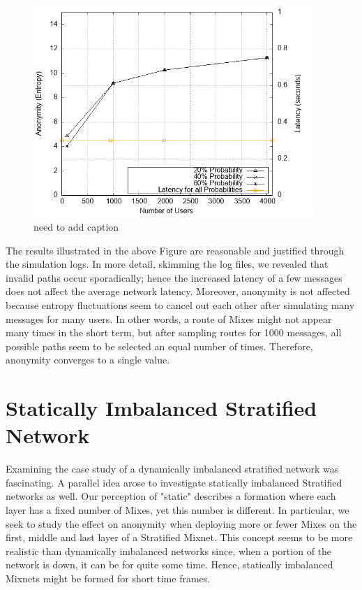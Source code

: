\documentclass[logo,msc,cyber]{infthesis}   %
\begin{document}
\begin{figure}[h!]
    \centering
    \includegraphics[height=8cm]{figures/simulator_extentions/mix_failure.png}
    \caption{need to add caption}
    \label{fig:dynamic-crash-probability}
\end{figure}    


The results illustrated in the above Figure are reasonable and justified through
the simulation logs. In more detail, skimming the log files, we revealed that
invalid paths occur sporadically; hence the increased latency of a few messages
does not affect the average network latency. Moreover, anonymity is not affected
because entropy fluctuations seem to cancel out each other after simulating many
messages for many users. In other words, a route of Mixes might not appear many
times in the short term, but after sampling routes for 1000 messages, all
possible paths seem to be selected an equal number of times. Therefore,
anonymity converges to a single value.

\section{Statically Imbalanced Stratified Network}

Examining the case study of a dynamically imbalanced stratified network was
fascinating. A parallel idea arose to investigate statically imbalanced
Stratified networks as well. Our perception of "static" describes a formation
where each layer has a fixed number of Mixes, yet this number is different. In
particular, we seek to study the effect on anonymity when deploying more or
fewer Mixes on the first, middle and last layer of a Stratified Mixnet. This
concept seems to be more realistic than dynamically imbalanced networks since,
when a portion of the network is down, it can be for quite some time. Hence,
statically imbalanced Mixnets might be formed for short time frames.
\end{document}
